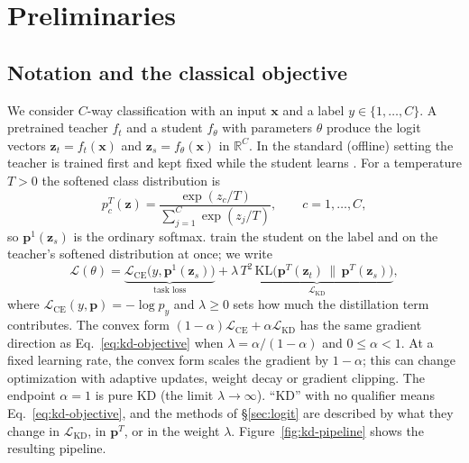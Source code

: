 \section{Preliminaries}
\label{sec:prelim}

\subsection{Notation and the classical objective}
\label{sec:prelim-notation}

We consider $C$-way classification with an input $\mathbf{x}$ and a label $y \in \{1,\dots,C\}$.
A pretrained teacher $f_t$ and a student $f_\theta$ with parameters $\theta$ produce the logit vectors
$\mathbf{z}_t = f_t(\mathbf{x})$ and $\mathbf{z}_s = f_\theta(\mathbf{x})$ in $\mathbb{R}^C$.
In the standard (offline) setting the teacher is trained first and kept fixed while the student
learns \citep{hinton2015kd}. For a temperature $T>0$ the softened class distribution is
\begin{equation}
  \label{eq:softmax-T}
  p^{T}_{c}(\mathbf{z}) = \frac{\exp(z_c/T)}{\sum_{j=1}^{C}\exp(z_j/T)}, \qquad c=1,\dots,C,
\end{equation}
so $\mathbf{p}^{1}(\mathbf{z}_s)$ is the ordinary softmax. \citet{hinton2015kd} train the student on the
label and on the teacher's softened distribution at once; we write
\begin{equation}
  \label{eq:kd-objective}
  \mathcal{L}(\theta) = \underbrace{\mathcal{L}_{\mathrm{CE}}\big(y,\mathbf{p}^{1}(\mathbf{z}_s)\big)}_{\text{task loss}}
  + \lambda\,\underbrace{T^{2}\,\mathrm{KL}\big(\mathbf{p}^{T}(\mathbf{z}_t)\,\big\|\,\mathbf{p}^{T}(\mathbf{z}_s)\big)}_{\mathcal{L}_{\mathrm{KD}}},
\end{equation}
where $\mathcal{L}_{\mathrm{CE}}(y,\mathbf{p}) = -\log p_y$ and $\lambda \ge 0$ sets how much the
distillation term contributes. The convex form $(1-\alpha)\mathcal{L}_{\mathrm{CE}} + \alpha\mathcal{L}_{\mathrm{KD}}$ has the same gradient direction as Eq.~\eqref{eq:kd-objective} when $\lambda=\alpha/(1-\alpha)$ and $0\leq\alpha<1$. At a fixed learning rate, the convex form scales the gradient by $1-\alpha$; this can change optimization with adaptive updates, weight decay or gradient clipping. The endpoint $\alpha=1$ is pure KD (the limit $\lambda\to\infty$). ``KD'' with no qualifier means
Eq.~\eqref{eq:kd-objective}, and the methods of \S\ref{sec:logit} are described by what they change
in $\mathcal{L}_{\mathrm{KD}}$, in $\mathbf{p}^{T}$, or in the weight $\lambda$.
Figure~\ref{fig:kd-pipeline} shows the resulting pipeline.

